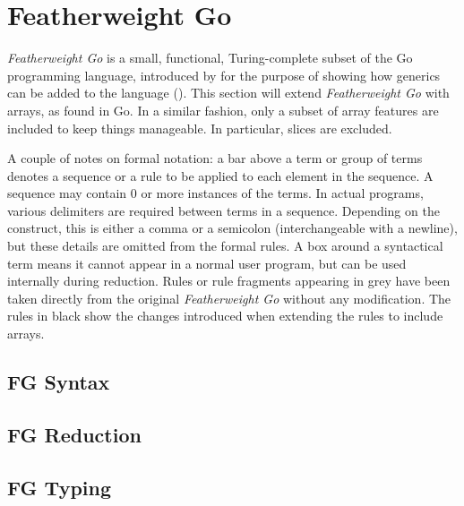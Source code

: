 \section{Featherweight Go}

\emph{Featherweight Go} is a small, functional, Turing-complete subset of the Go
programming language, introduced by \citeauthor{fg} for the purpose of showing
how generics can be added to the language (\citeyear{fg}). This section will
extend \emph{Featherweight Go} with arrays, as found in Go. In a similar
fashion, only a subset of array features are included to keep things manageable.
In particular, slices are excluded.

A couple of notes on formal notation: a bar above a term or group of terms
denotes a sequence or a rule to be applied to each element in the sequence. A
sequence may contain 0 or more instances of the terms. In actual programs,
various delimiters are required between terms in a sequence. Depending on the
construct, this is either a comma or a semicolon (interchangeable with a
newline), but these details are omitted from the formal rules. A box around a
syntactical term means it cannot appear in a normal user program, but can be
used internally during reduction. Rules or rule fragments appearing in grey have
been taken directly from the original \emph{Featherweight Go} \autocite{fg}
without any modification. The rules in black show the changes introduced when
extending the rules to include arrays.

\subsection{FG Syntax}



\subsection{FG Reduction}



\subsection{FG Typing}




